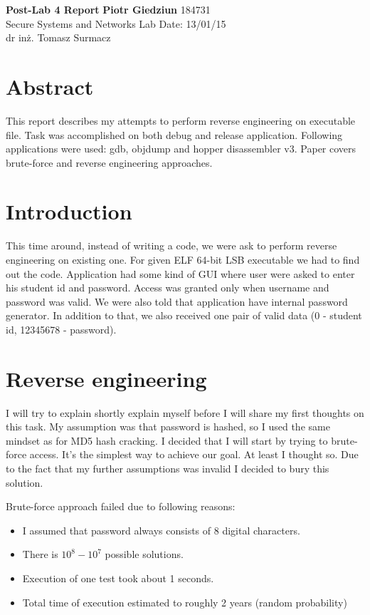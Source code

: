 \documentclass[a4paper, 11pt]{article}
\begin{document}
\noindent
\large\textbf{Post-Lab 4 Report} \hfill \textbf{Piotr Giedziun} 184731\\
\normalsize Secure Systems and Networks \hfill  Lab Date: 13/01/15 \\
dr inż. Tomasz Surmacz

\section*{Abstract}
This report describes my attempts to perform reverse engineering on executable file. Task was accomplished on both debug and release application.
Following applications were used: gdb, objdump and hopper disassembler v3. Paper covers brute-force and reverse engineering approaches.


\section*{Introduction}
This time around, instead of writing a code, we were ask to perform reverse engineering on existing one.
For given ELF 64-bit LSB executable we had to find out the code. Application had some kind of GUI where user were asked to enter his student id and password.
Access was granted only when username and password was valid. We were also told that application have internal password generator. 
In addition to that, we also received one pair of valid data (0 - student id, 12345678 - password).

\section*{Reverse engineering}

I will try to explain shortly explain myself before I will share my first thoughts on this task.
My assumption was that password is hashed, so I used the same mindset as for MD5 hash cracking.
I decided that I will start by trying to brute-force access. It's the simplest way to achieve our goal. At least I thought so.
Due to the fact that my further assumptions was invalid I decided to bury this solution.

\noindent Brute-force approach failed due to following reasons:
\begin{itemize}
\item I assumed that password always consists of 8 digital characters.
\item There is $10^8-10^7$ possible solutions.
\item Execution of one test took about 1 seconds.
\item Total time of execution estimated to roughly 2 years (random probability)
\end{itemize}
\end{document}
